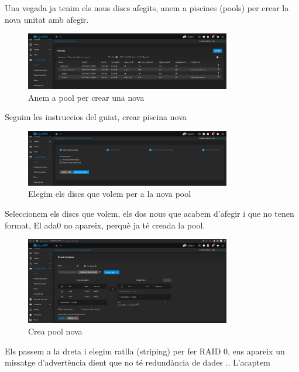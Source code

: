 \documentclass[
  10pt,
]{krantz}
\begin{document}
Una vegada ja tenim els nous discs afegits, anem a piscines (pools) per crear la nova unitat amb afegir.

\begin{figure}
\centering
\includegraphics[width=0.8\textwidth,height=\textheight]{imatges/proxmox/disc_pastrougt1.png}
\caption{Anem a pool per crear una nova}
\end{figure}

Seguim les instruccios del guiat, crear piscina nova

\begin{figure}
\centering
\includegraphics[width=0.8\textwidth,height=\textheight]{imatges/proxmox/disc_pastrougt2.png}
\caption{Elegim els discs que volem per a la nova pool}
\end{figure}

Seleccionem els discs que volem, els dos nous que acabem d'afegir i que no tenen format, El ada0 no apareix, perquè ja té creada la pool.

\begin{figure}
\centering
\includegraphics[width=0.8\textwidth,height=\textheight]{imatges/proxmox/disc_pastrougt3.png}
\caption{Crea pool nova}
\end{figure}

Els passem a la dreta i elegim ratlla (striping) per fer RAID 0, ens apareix un missatge d'advertència dient que no té redundància de dades .. L'acaptem
\end{document}
